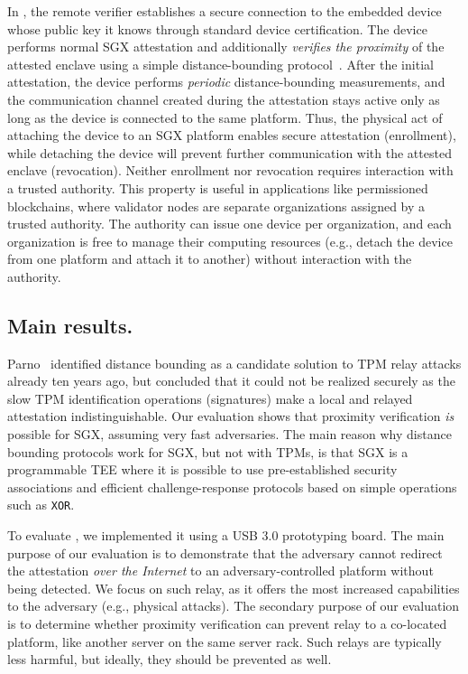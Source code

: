 In \name, the remote verifier establishes a secure connection to the embedded device whose public key it knows through standard device certification. The device performs normal SGX attestation and additionally \emph{verifies the proximity} of the attested enclave using a simple distance-bounding protocol~\cite{distanceBounding}. After the initial attestation, the device performs \emph{periodic} distance-bounding measurements, and the communication channel created during the attestation stays active only as long as the device is connected to the same platform. Thus, the physical act of attaching the device to an SGX platform enables secure attestation (enrollment), while detaching the device will prevent further communication with the attested enclave (revocation). Neither enrollment nor revocation requires interaction with a trusted authority. This property is useful in applications like permissioned blockchains, where validator nodes are separate organizations assigned by a trusted authority. The authority can issue one device per organization, and each organization is free to manage their computing resources (e.g., detach the device from one platform and attach it to another) without interaction with the authority. 


\subsection{Main results.} Parno~\cite{parno2008bootstrapping} identified distance bounding as a candidate solution to TPM relay attacks already ten years ago, but concluded that it could not be realized securely as the slow TPM identification operations (signatures) make a local and relayed attestation indistinguishable. Our evaluation shows that proximity verification \emph{is} possible for SGX, assuming very fast adversaries. The main reason why distance bounding protocols work for SGX, but not with TPMs, is that SGX is a programmable TEE where it is possible to use pre-established security associations and efficient challenge-response protocols based on simple operations such as \texttt{XOR}.

To evaluate \name, we implemented it using a USB 3.0 prototyping board. The main purpose of our evaluation is to demonstrate that the adversary cannot redirect the attestation \emph{over the Internet} to an adversary-controlled platform without being detected. We focus on such relay, as it offers the most increased capabilities to the adversary (e.g., physical attacks). The secondary purpose of our evaluation is to determine whether proximity verification can prevent relay to a co-located platform, like another server on the same server rack. Such relays are typically less harmful, but ideally, they should be prevented as well.



